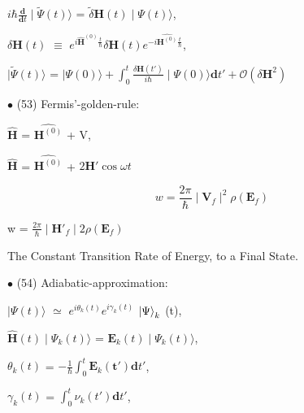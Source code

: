 \documentclass[a4paper, 10pt, onepage]{elegantbook}
\begin{document}
{$i \hbar \frac{ \mathbf d}{\mathbf dt} \mid {\tilde \Psi} (t) \rangle$ = $ {\tilde \delta} \mathbf H (t) \mid \Psi (t) 
\rangle$,  

$\delta \mathbf H (t)$ $\equiv$ $e^{i \hat{\mathbf H}^{(0)}{\frac{t}{\hbar}}} \delta \mathbf H (t) e^{- i \hat{\mathbf 
H^{(0)}} {\frac{t}{\hbar}}}$,  

$\mid \tilde \Psi (t) \rangle$ = $ \mid \Psi(0) \rangle + \int_0^t \frac{ \delta \mathbf H(t')} {i \hbar} \mid \Psi(0) 
\rangle \mathbf dt' + \mathcal O( \delta \mathbf H^2)$  

$\bullet$ (53) Fermis'-golden-rule:  
\label{Fermis'-golden-rule}


$\hat{\mathbf H}$ = $\hat{\mathbf H^{(0)}}$ + V,  

$\hat{\mathbf H}$ = $\hat{\mathbf H^{(0)}}$ + $2 \mathbf H' \cos \omega t$  

\label{eq:Fermis'-golden-rule}
\begin{equation}
w = \frac{2 \pi}{\hbar} \mid \mathbf V_f \mid^2 \rho(\mathbf E_f)
\end{equation}

w = $\frac{2 \pi}{\hbar} \mid \mathbf H'_f \mid 2 \rho(\mathbf E_f)$  


The Constant Transition Rate of Energy, to a Final State. 





\medskip

$\bullet$ (54) Adiabatic-approximation: 

$\mid \Psi(t) \rangle$ $\simeq$ $e^{i \theta_k(t)} e^{i \gamma_k(t)}$ $\ket \Psi_k$ (t),  

$\hat{\mathbf H} (t) \mid \Psi_k(t) \rangle$ = $\mathbf E_k(t) \mid \Psi_k(t) \rangle$, 

$\theta_k(t)$ = $ -\frac{1}{\hbar} \int_0^t \mathbf E_k(\mathbf t') {\mathbf dt'}$, 

$\gamma_k(t)$ = $\int_0^t \nu_k(t') {\mathbf dt'}$, 

}
\end{document}
